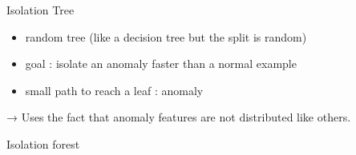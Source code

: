 \begin{frame}{Isolation Tree}
  \begin{itemize}
    \item random tree (like a decision tree but the split is random)
    \item goal : isolate an anomaly faster than a normal example
    \item small path to reach a leaf : anomaly
  \end{itemize}

  → Uses the fact that anomaly features are not distributed like others.
\end{frame}

\begin{frame}{Isolation forest}
\end{frame}